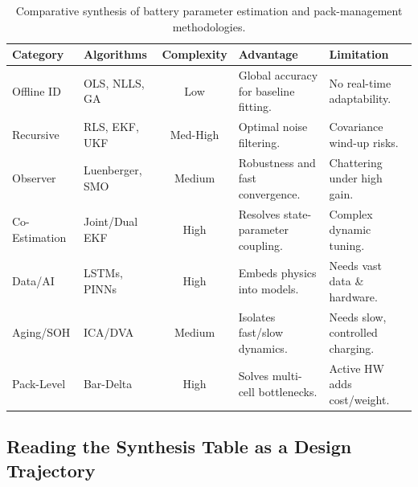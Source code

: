 \begin{table}[htbp]
\centering
\caption{Comparative synthesis of battery parameter estimation and pack-management methodologies.}
\label{tab:ch14_methodology_synthesis}
\small
\renewcommand{\arraystretch}{1.3}
\begin{tabularx}{\textwidth}{|l|l|c|>{\raggedright\arraybackslash}X|>{\raggedright\arraybackslash}X|}
\hline
\textbf{Category} & \textbf{Algorithms} & \textbf{Complexity} & \textbf{Advantage} & \textbf{Limitation} \\ \hline
Offline ID & OLS, NLLS, GA & Low & Global accuracy for baseline fitting. & No real-time adaptability. \\ \hline
Recursive & RLS, EKF, UKF & Med-High & Optimal noise filtering. & Covariance wind-up risks. \\ \hline
Observer & Luenberger, SMO & Medium & Robustness and fast convergence. & Chattering under high gain. \\ \hline
Co-Estimation & Joint/Dual EKF & High & Resolves state-parameter coupling. & Complex dynamic tuning. \\ \hline
Data/AI & LSTMs, PINNs & High & Embeds physics into models. & Needs vast data \& hardware. \\ \hline
Aging/SOH & ICA/DVA & Medium & Isolates fast/slow dynamics. & Needs slow, controlled charging. \\ \hline
Pack-Level & Bar-Delta & High & Solves multi-cell bottlenecks. & Active HW adds cost/weight. \\ \hline
\end{tabularx}
\end{table}

\subsection{Reading the Synthesis Table as a Design Trajectory}
\label{subsec:14_reading_table}

